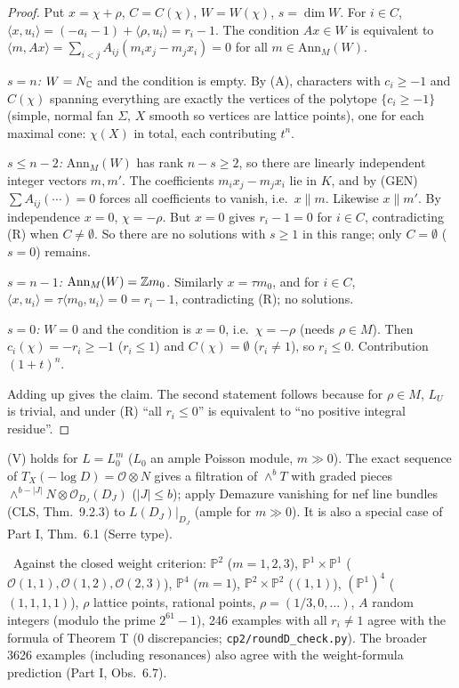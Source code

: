 \begin{proof}
Put $x=\chi+\rho$, $C=C(\chi)$, $W=W(\chi)$, $s=\dim W$. For $i\in C$, $\langle x,u_i\rangle=(-a_i-1)+\langle\rho,u_i\rangle=r_i-1$. The condition $Ax\in W$ is equivalent to $\langle m,Ax\rangle=\sum_{i<j}A_{ij}(m_ix_j-m_jx_i)=0$ for all $m\in\mathrm{Ann}_M(W)$.

\emph{$s=n$:} $W=N_\mathbb C$ and the condition is empty. By (A), characters with $c_i\ge-1$ and $C(\chi)$ spanning everything are exactly the vertices of the polytope $\{c_i\ge-1\}$ (simple, normal fan $\Sigma$, $X$ smooth so vertices are lattice points), one for each maximal cone: $\chi(X)$ in total, each contributing $t^n$.

\emph{$s\le n-2$:} $\mathrm{Ann}_M(W)$ has rank $n-s\ge2$, so there are linearly independent integer vectors $m,m'$. The coefficients $m_ix_j-m_jx_i$ lie in $K$, and by (GEN) $\sum A_{ij}(\cdots)=0$ forces all coefficients to vanish, i.e.\ $x\parallel m$. Likewise $x\parallel m'$. By independence $x=0$, $\chi=-\rho$. But $x=0$ gives $r_i-1=0$ for $i\in C$, contradicting (R) when $C\ne\emptyset$. So there are no solutions with $s\ge1$ in this range; only $C=\emptyset$ ($s=0$) remains.

\emph{$s=n-1$:} $\mathrm{Ann}_M(W)=\mathbb Z m_0$. Similarly $x=\tau m_0$, and for $i\in C$, $\langle x,u_i\rangle=\tau\langle m_0,u_i\rangle=0=r_i-1$, contradicting (R); no solutions.

\emph{$s=0$:} $W=0$ and the condition is $x=0$, i.e.\ $\chi=-\rho$ (needs $\rho\in M$). Then $c_i(\chi)=-r_i\ge-1$ ($r_i\le1$) and $C(\chi)=\emptyset$ ($r_i\ne1$), so $r_i\le0$. Contribution $(1+t)^n$.

Adding up gives the claim. The second statement follows because for $\rho\in M$, $L_U$ is trivial, and under (R) ``all $r_i\le0$'' is equivalent to ``no positive integral residue''.\qedhere
\end{proof}
\begin{rem}[On (V)\ \tC]
(V) holds for $L=L_0^m$ ($L_0$ an ample Poisson module, $m\gg0$). The exact sequence of $T_X(-\log D)=\mathcal O\otimes N$ gives a filtration of $\wedge^bT$ with graded pieces $\wedge^{b-|J|}N\otimes\mathcal O_{D_J}(D_J)$ ($|J|\le b$); apply Demazure vanishing for nef line bundles (CLS, Thm.\ 9.2.3\tQ) to $L(D_J)|_{D_J}$ (ample for $m\gg0$). It is also a special case of Part I, Thm.\ 6.1 (Serre type).
\end{rem}
\tV\ Against the closed weight criterion: $\mathbb{P}^2$ ($m=1,2,3$), $\mathbb{P}^1\times\mathbb{P}^1$ ($\mathcal O(1,1),\mathcal O(1,2),\mathcal O(2,3)$), $\mathbb{P}^4$ ($m=1$), $\mathbb{P}^2\times\mathbb{P}^2$ ($(1,1)$), $(\mathbb{P}^1)^4$ ($(1,1,1,1)$), $\rho$ lattice points, rational points, $\rho=(1/3,0,\dots)$, $A$ random integers (modulo the prime $2^{61}-1$), 246 examples with all $r_i\ne1$ agree with the formula of Theorem T (0 discrepancies; \texttt{cp2/roundD\_check.py}). The broader 3626 examples (including resonances) also agree with the weight-formula prediction (Part I, Obs.\ 6.7).

